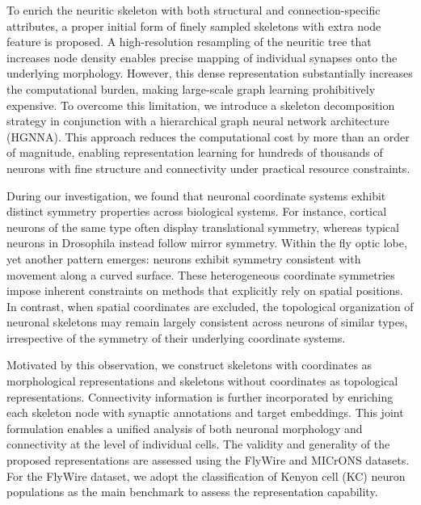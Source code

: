 \documentclass{article}
\begin{document}
To enrich the neuritic skeleton with both structural and connection-specific attributes, a proper initial form of finely sampled skeletons with extra node feature is proposed. A high-resolution resampling of the neuritic tree that increases node density enables precise mapping of individual synapses onto the underlying morphology. However, this dense representation substantially increases the computational burden, making large-scale graph learning prohibitively expensive. %
To overcome this limitation, we introduce a skeleton decomposition strategy in conjunction with a hierarchical graph neural network architecture (HGNNA). This approach reduces the computational cost by more than an order of magnitude, enabling representation learning for hundreds of thousands of neurons with fine structure and connectivity under practical resource constraints.

During our investigation, we found that neuronal coordinate systems exhibit distinct symmetry properties across biological systems. For instance, cortical neurons of the same type often display translational symmetry, whereas typical neurons in Drosophila instead follow mirror symmetry. Within the fly optic lobe, yet another pattern emerges: neurons exhibit symmetry consistent with movement along a curved surface. These heterogeneous coordinate symmetries impose inherent constraints on methods that explicitly rely on spatial positions. In contrast, when spatial coordinates are excluded, the topological organization of neuronal skeletons may remain largely consistent across neurons of similar types, irrespective of the symmetry of their underlying coordinate systems.

Motivated by this observation, we construct skeletons with coordinates as morphological representations and skeletons without coordinates as topological representations. Connectivity information is further incorporated by enriching each skeleton node with synaptic annotations and target embeddings. This joint formulation enables a unified analysis of both neuronal morphology and connectivity at the level of individual cells.
The validity and generality of the proposed representations are assessed using the FlyWire and MICrONS datasets. For the FlyWire dataset, we adopt the classification of Kenyon cell (KC) neuron populations as the main benchmark to assess the representation capability.
\end{document}
